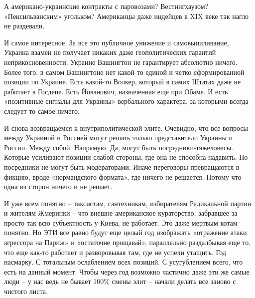 А американо-украинские контракты с паровозами? Вестингхаузом? «Пенсильванским»
угольком? Американцы даже индейцев в XIX веке так нагло не раздевали.

И самое интересное. За все это публичное унижение и самовыпиливание, Украина
взамен не получает никаких даже геополитических гарантий неприкосновенности.
Украине Вашингтон не гарантирует абсолютно ничего. Более того, в самом
Вашингтоне нет какой-то единой и четко сформированной позиции по Украине. Есть
какой-то Волкер, который в самих Штатах даже не работает в Госдепе. Есть
Йованович, назначенная еще при Обаме. И есть «позитивные сигналы для Украины»
вербального характера, за которыми всегда следует то самое ничего.

И снова возвращаемся к внутриполитической элите. Очевидно, что все вопросы
между Украиной и Россией могут решать только представители Украины и России.
Между собой. Напрямую. Да, могут быть посредники-тяжеловесы. Которые усиливают
позиции слабой стороны, где она не способна надавить. Но посредники не могут
быть модераторами. Иначе переговоры превращаются в фикцию, вроде «нормандского
формата», где ничего не решается. Потому что одна из сторон ничего и не решает.

И уже всем понятно – таксистам, сантехникам, избирателям Радикальной партии и
жителям Жмеринки – что внешне-американское кураторство, забравшее за просто так
всю субъектность у Киева, не работает. Это даже мертвым котам понятно. Но ЭТИ
все равно будут еще целый год изображать «отражение атаки агрессора на Париж» и
«остаточне прощавай», параллельно раздалбывая еще то, что еще как-то работает и
разворовывая там, где не успели утащить. Год насмарку. С тотальным ослаблением
всех позиций. С усугублением всего, что есть на данный момент. Чтобы через год
возможно частично даже эти же самые люди – у нас ведь не бывает 100\% смены
элит – начали делать все заново с чистого листа.

